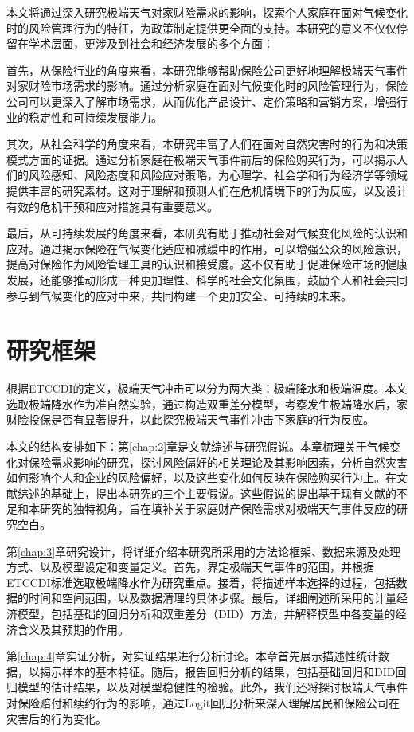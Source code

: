 本文将通过深入研究极端天气对家财险需求的影响，探索个人家庭在面对气候变化时的风险管理行为的特征，为政策制定提供更全面的支持。本研究的意义不仅仅停留在学术层面，更涉及到社会和经济发展的多个方面：

首先，从保险行业的角度来看，本研究能够帮助保险公司更好地理解极端天气事件对家财险市场需求的影响。通过分析家庭在面对气候变化时的风险管理行为，保险公司可以更深入了解市场需求，从而优化产品设计、定价策略和营销方案，增强行业的稳定性和可持续发展能力。

其次，从社会科学的角度来看，本研究丰富了人们在面对自然灾害时的行为和决策模式方面的证据。通过分析家庭在极端天气事件前后的保险购买行为，可以揭示人们的风险感知、风险态度和风险应对策略，为心理学、社会学和行为经济学等领域提供丰富的研究素材。这对于理解和预测人们在危机情境下的行为反应，以及设计有效的危机干预和应对措施具有重要意义。

最后，从可持续发展的角度来看，本研究有助于推动社会对气候变化风险的认识和应对。通过揭示保险在气候变化适应和减缓中的作用，可以增强公众的风险意识，提高对保险作为风险管理工具的认识和接受度。这不仅有助于促进保险市场的健康发展，还能够推动形成一种更加理性、科学的社会文化氛围，鼓励个人和社会共同参与到气候变化的应对中来，共同构建一个更加安全、可持续的未来。

\section{研究框架}
根据ETCCDI的定义，极端天气冲击可以分为两大类：极端降水和极端温度。本文选取极端降水作为准自然实验，通过构造双重差分模型，考察发生极端降水后，家财险投保是否有显著提升，以此探究极端天气事件冲击下家庭的行为反应。

本文的结构安排如下：第\ref{chap:2}章是文献综述与研究假说。本章梳理关于气候变化对保险需求影响的研究，探讨风险偏好的相关理论及其影响因素，分析自然灾害如何影响个人和企业的风险偏好，以及这些变化如何反映在保险购买行为上。在文献综述的基础上，提出本研究的三个主要假说。这些假说的提出基于现有文献的不足和本研究的独特视角，旨在填补关于家庭财产保险需求对极端天气事件反应的研究空白。

第\ref{chap:3}章研究设计，将详细介绍本研究所采用的方法论框架、数据来源及处理方式、以及模型设定和变量定义。首先，界定极端天气事件的范围，并根据ETCCDI标准选取极端降水作为研究重点。接着，将描述样本选择的过程，包括数据的时间和空间范围，以及数据清理的具体步骤。最后，详细阐述所采用的计量经济模型，包括基础的回归分析和双重差分（DID）方法，并解释模型中各变量的经济含义及其预期的作用。

第\ref{chap:4}章实证分析，对实证结果进行分析讨论。本章首先展示描述性统计数据，以揭示样本的基本特征。随后，报告回归分析的结果，包括基础回归和DID回归模型的估计结果，以及对模型稳健性的检验。此外，我们还将探讨极端天气事件对保险赔付和续约行为的影响，通过Logit回归分析来深入理解居民和保险公司在灾害后的行为变化。

